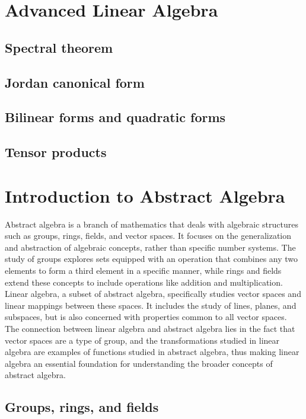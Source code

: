 \documentclass{article}
\begin{document}
\clearpage
\section{Advanced Linear Algebra}
\subsection{Spectral theorem}
\subsection{Jordan canonical form}
\subsection{Bilinear forms and quadratic forms}
\subsection{Tensor products}











\clearpage
\section{Introduction to Abstract Algebra}

	Abstract algebra is a branch of mathematics that deals with algebraic structures such as groups, rings, fields, and vector spaces. It focuses on the generalization and abstraction of algebraic concepts, rather than specific number systems. The study of groups explores sets equipped with an operation that combines any two elements to form a third element in a specific manner, while rings and fields extend these concepts to include operations like addition and multiplication. Linear algebra, a subset of abstract algebra, specifically studies vector spaces and linear mappings between these spaces. It includes the study of lines, planes, and subspaces, but is also concerned with properties common to all vector spaces. The connection between linear algebra and abstract algebra lies in the fact that vector spaces are a type of group, and the transformations studied in linear algebra are examples of functions studied in abstract algebra, thus making linear algebra an essential foundation for understanding the broader concepts of abstract algebra.

\subsection{Groups, rings, and fields}
\end{document}
